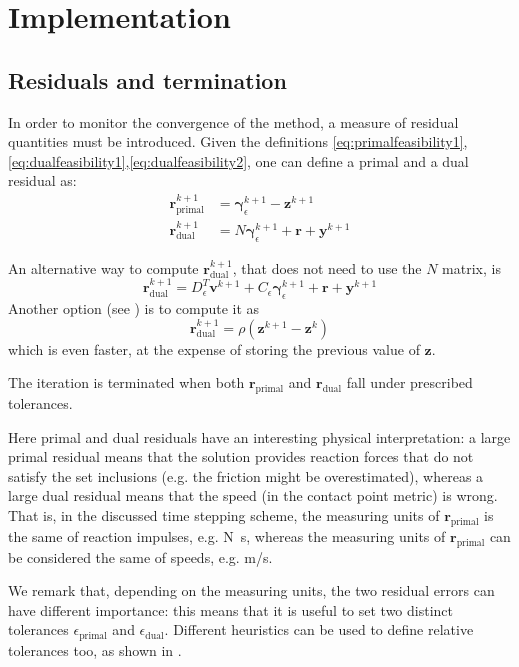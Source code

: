 \documentclass[final,3p]{elsarticle}
\newcommand{\vect}[1]{\bm{#1}}
\begin{document}
\section{Implementation}


\subsection{Residuals and termination}

In order to monitor the convergence of the method, a measure of residual quantities must be introduced. 
Given the definitions \eqref{eq:primalfeasibility1},\eqref{eq:dualfeasibility1},\eqref{eq:dualfeasibility2}, one can define a primal and a dual residual as:
%
\begin{align}
 \vect{r}_{\text{primal}}^{k+1} &= \vect{\gamma}_\epsilon^{k+1}-\vect{z}^{k+1}   \\
 \vect{r}_{\text{dual}}^{k+1} &= N \vect{\gamma}_\epsilon^{k+1}+\vect{r}+\vect{y}^{k+1} 
\end{align}

An alternative way to compute $\vect{r}_{\text{dual}}^{k+1}$, that does not need to use the $N$ matrix, is 
\[
   \vect{r}_{\text{dual}}^{k+1} = D_\epsilon^T \vect{v}^{k+1} +C_\epsilon \vect{\gamma}_\epsilon^{k+1} + \vect{r} + \vect{y}^{k+1}
\]
Another option (see \cite{Boyd2011}) is to compute it as
\[
   \vect{r}_{\text{dual}}^{k+1} = \rho (\vect{z}^{k+1} - \vect{z}^{k})
\]
which is even faster, at the expense of storing the previous value of $\vect{z}$. 

The iteration is terminated when both $\vect{r}_{\text{primal}}$ and $\vect{r}_{\text{dual}}$ fall under prescribed tolerances. 

Here primal and dual residuals have an interesting physical interpretation: a large primal residual means that the solution provides reaction forces that do not satisfy the set inclusions (e.g. the friction might be overestimated), whereas a large dual residual means that the speed (in the contact point metric) is wrong. That is, in the discussed time stepping scheme, the measuring units of $\vect{r}_{\text{primal}}$ is the same of reaction impulses, e.g. \si{N.s}, whereas the measuring units of $\vect{r}_{\text{primal}}$ can be considered the same of speeds, e.g. \si{m/s}.

We remark that, depending on the measuring units, the two residual errors can have different importance: this means that it is useful to set two distinct tolerances $\epsilon_{\text{primal}}$ and $\epsilon_{\text{dual}}$. Different heuristics can be used to define relative tolerances too, as shown in \cite{Stellato2020}.
\end{document}
